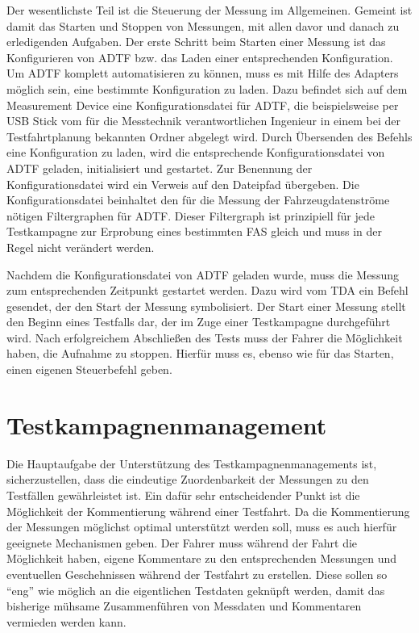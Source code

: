 \documentclass[12pt,a4paper]{report}
\begin{document}
Der wesentlichste Teil ist die Steuerung der Messung im Allgemeinen. Gemeint ist damit das Starten und Stoppen von Messungen, mit allen davor und danach zu erledigenden Aufgaben. Der erste Schritt beim Starten einer Messung ist das Konfigurieren von ADTF bzw. das Laden einer entsprechenden Konfiguration. Um ADTF komplett automatisieren zu können, muss es mit Hilfe des Adapters möglich sein, eine bestimmte Konfiguration zu laden. Dazu befindet sich auf dem Measurement Device eine Konfigurationsdatei für ADTF, die beispielsweise per USB Stick vom für die Messtechnik verantwortlichen Ingenieur in einem bei der Testfahrtplanung bekannten Ordner abgelegt wird. Durch Übersenden des Befehls eine Konfiguration zu laden, wird die entsprechende Konfigurationsdatei von ADTF geladen, initialisiert und gestartet. Zur Benennung der Konfigurationsdatei wird ein Verweis auf den Dateipfad übergeben. Die Konfigurationsdatei beinhaltet den für die Messung der Fahrzeugdatenströme nötigen Filtergraphen für ADTF. Dieser Filtergraph ist prinzipiell für jede Testkampagne zur Erprobung eines bestimmten FAS gleich und muss in der Regel nicht verändert werden.

Nachdem die Konfigurationsdatei von ADTF geladen wurde, muss die Messung zum entsprechenden Zeitpunkt gestartet werden. Dazu wird vom TDA ein Befehl gesendet, der den Start der Messung symbolisiert. Der Start einer Messung stellt den Beginn eines Testfalls dar, der im Zuge einer Testkampagne durchgeführt wird. Nach erfolgreichem Abschließen des Tests muss der Fahrer die Möglichkeit haben, die Aufnahme zu stoppen. Hierfür muss es, ebenso wie für das Starten, einen eigenen Steuerbefehl geben. 
\section{Testkampagnenmanagement}\label{sec:Testkampagnenmanagement}
Die Hauptaufgabe der Unterstützung des Testkampagnenmanagements ist, sicherzustellen, dass die eindeutige Zuordenbarkeit der Messungen zu den Testfällen gewährleistet ist. Ein dafür sehr entscheidender Punkt ist die Möglichkeit der Kommentierung während einer Testfahrt. Da die Kommentierung der Messungen möglichst optimal unterstützt werden soll, muss es auch hierfür geeignete Mechanismen geben. Der Fahrer muss während der Fahrt die Möglichkeit haben, eigene Kommentare zu den entsprechenden Messungen und eventuellen Geschehnissen während der Testfahrt zu erstellen. Diese sollen so "`eng"' wie möglich an die eigentlichen Testdaten geknüpft werden, damit das bisherige mühsame Zusammenführen von Messdaten und Kommentaren vermieden werden kann.
\end{document}
